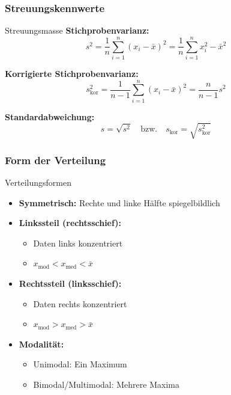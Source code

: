 \subsubsection{Streuungskennwerte}

\begin{definition}{Streuungsmasse}
\textbf{Stichprobenvarianz:}
$$s^2 = \frac{1}{n}\sum_{i=1}^n (x_i - \bar{x})^2 = \frac{1}{n}\sum_{i=1}^n x_i^2 - \bar{x}^2$$

\textbf{Korrigierte Stichprobenvarianz:}
$$s_{\text{kor}}^2 = \frac{1}{n-1}\sum_{i=1}^n (x_i - \bar{x})^2 = \frac{n}{n-1}s^2$$

\textbf{Standardabweichung:}
$$s = \sqrt{s^2} \quad \text{bzw.} \quad s_{\text{kor}} = \sqrt{s_{\text{kor}}^2}$$
\end{definition}

\subsubsection{Form der Verteilung}

\begin{concept}{Verteilungsformen}
\begin{itemize}
    \item \textbf{Symmetrisch:} Rechte und linke Hälfte spiegelbildlich
    \item \textbf{Linkssteil (rechtsschief):}
    \begin{itemize}
        \item Daten links konzentriert
        \item $x_{\text{mod}} < x_{\text{med}} < \bar{x}$
    \end{itemize}
    \item \textbf{Rechtssteil (linksschief):}
    \begin{itemize}
        \item Daten rechts konzentriert
        \item $x_{\text{mod}} > x_{\text{med}} > \bar{x}$
    \end{itemize}
    \item \textbf{Modalität:}
    \begin{itemize}
        \item Unimodal: Ein Maximum
        \item Bimodal/Multimodal: Mehrere Maxima
    \end{itemize}
\end{itemize}
\end{concept}